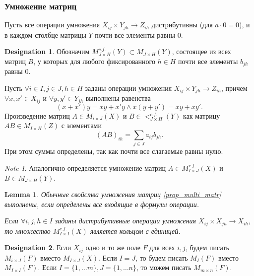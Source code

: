 \documentclass[11pt]{book}
\theoremstyle{definition}
\theoremstyle{plain}
\theoremstyle{plain}
\newtheorem{lm}{Lemma}
\theoremstyle{definition}
\newtheorem*{name}{Designation}
\theoremstyle{remark}
\newtheorem*{note}{Note}
\begin{document}
\subsubsection{Умножение матриц}
Пусть все операции умножения  $ X_{ij}\times Y_{jh} \to Z_{ih}$ дистрибутивны (для $ a \cdot 0 = 0$), и в каждом столбце матрицы $ Y$ почти все элементы равны 0. 
\begin{name}
    Обозначим $ M_{J\times H}^{c.f.}(Y) \subset M_{J\times H}(Y)$, состоящее из всех матриц $ B$, у которых для любого фиксированного  $ h \in H$ почти все элементы $ b_{jh}$ равны 0.
\end{name}
\begin{defn}
    Пусть $ \forall i \in I, j \in J, h \in H$ заданы операции умножения $ X_{ij} \times Y_{jh} \to  Z_{ih}$, причем $ \forall  x, x' \in X_{ij}$ и $ \forall y, y' \in Y_{jh}$ выполнены равенства
    \[
	(x+x')y = xy + x'y \wedge x(y + y') = xy + xy'
    .\] 
    Произведение матриц $ A \in M_{i \times J}(X)$  и $ B \in <_{J\times H}^{c.f.}(Y)$ как матрицу $ AB \in M_{I \times H}(Z)$ с элементами 
    \[
	(AB)_{ih} = \sum_{j \in J}a_{ij}b_{jh}
    .\] 
    При этом суммы определены, так как почти все слагаемые равны нулю.
\end{defn}
\begin{note}
    Аналогично определяется умножение матриц $ A \in M_{I \times J}^{r.f.}(X)$ и $ B \in M_{J \times H}(Y)$.
\end{note}
\begin{lm}
    Обычные свойства умножения матриц \ref{prop_multi_matr} выполнены, если определены все входящие в формулы операции.

    Если $ \forall i, j, h \in I$ заданы дистрибутивные операции умножения $ X_{ij} \times X_{jh} \to  X_{ih}$, то множество $ M_{I \times I}^{c.f.}(X)$ является кольцом с единицей.
\end{lm}
\begin{name}
    Если $ X_{ij}$ одно и то же поле $ F$ для всех  $ i, j$, будем писать  $ M_{i\times J}(F)$ вместо $ M_{I\times J} (X)$. Если $ I = J$, то будем писать  $ M_{I}(F)$ вместо $ M_{I \times I}(F)$. Если $ I = \{1, \ldots m\}, J= \{1, \ldots n\}$, то можем писать $ M_{m \times n}(F)$.
\end{name}
\end{document}
